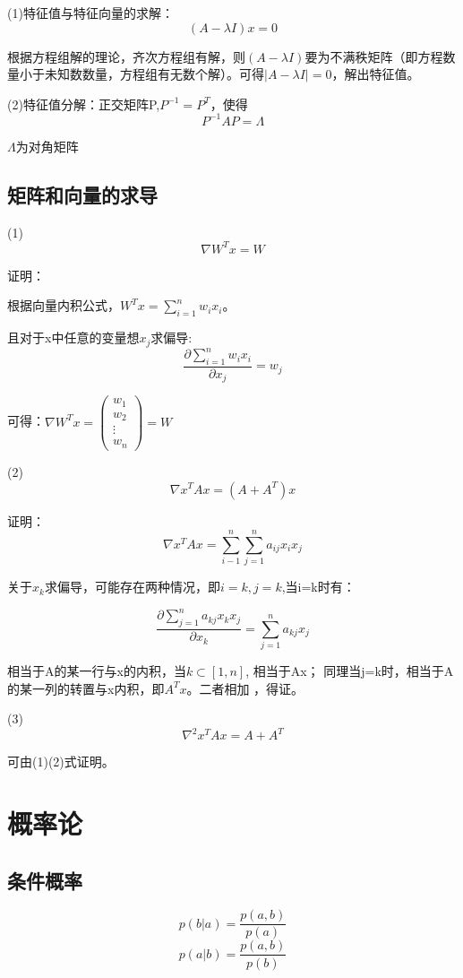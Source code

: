 \documentclass[UTF8]{ctexart} %
\begin{document}
		(1)特征值与特征向量的求解：
		\[(A-\lambda I)x=0\]
		
		根据方程组解的理论，齐次方程组有解，则$(A-\lambda I)$要为不满秩矩阵（即方程数量小于未知数数量，方程组有无数个解）。可得$|A-\lambda I|=0$，解出特征值。
		
		(2)特征值分解：正交矩阵P,$P^{-1}=P^T$，使得
		\[P^{-1}AP=\Lambda\]
		
		$\Lambda$为对角矩阵
		
		\subsection{矩阵和向量的求导}
		(1)
		\[\nabla W^Tx=W\]
		
		
		证明：
		
		\qquad 根据向量内积公式，$W^Tx=\sum_{i=1}^nw_ix_i$。
		
		\qquad 且对于x中任意的变量想$x_j$求偏导:
		\[\frac{\partial {\sum_{i=1}^nw_ix_i}}{\partial x_j}=w_j\]
		
		\qquad	可得：$\nabla W^Tx=\begin{pmatrix}
		w_1\\w_2\\\vdots\\w_n
		\end{pmatrix}=W$
		
		(2)
		\[
		\nabla x^TAx=(A+A^T)x
		\]
		
		证明：
		\[\nabla x^TAx = \sum_{i-1}^n\sum_{j=1}^na_{ij}x_ix_j\]
		
		\qquad 关于$x_k$求偏导，可能存在两种情况，即$i=k,j=k$,当i=k时有：
		
		\[ \frac{\partial{\sum_{j=1}^na_{kj}x_kx_j}}{\partial x_k} = 
		\sum_{j=1}^n a_{kj} x_j\]
		
		\qquad 相当于A的某一行与x的内积，当$k\subset [1,n]$, 相当于Ax；
		同理当j=k时，相当于A的某一列的转置与x内积，即$A^Tx$。二者相加 ，得证。
		
		(3)
		\[\nabla^2 x^TAx=A+A^T\]
		
		可由(1)(2)式证明。
		
		\section{概率论}
		
		\subsection{条件概率}
		\[p(b|a) = \frac{p(a,b)}{p(a)}\]
		\[p(a|b) = \frac{p(a,b)}{p(b)}\]
		
\end{document}
